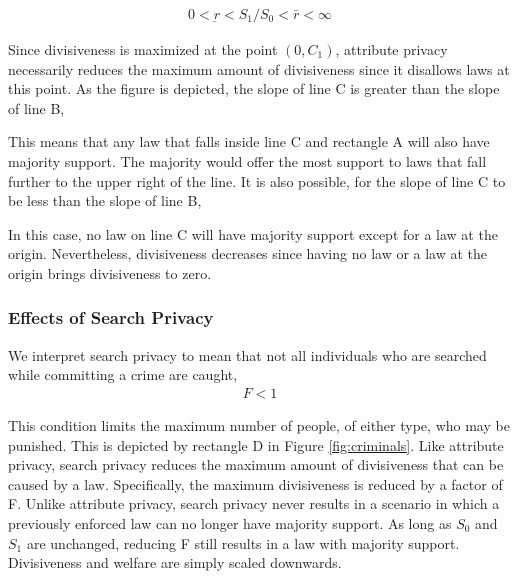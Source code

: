 \begin{align}
0 < \underbar r < S_1 /S_0 < \bar r < \infty
\end{align}

Since divisiveness is maximized at the point $ \left(0, C_1 \right)$, attribute privacy necessarily reduces the maximum amount of divisiveness since it disallows laws at this point.  As the figure is depicted, the slope of line C is greater than the slope of line B,


This means that any law that falls inside line C and rectangle A will also have majority support.  The majority would offer the most support to laws that fall further to the upper right of the line.  It is also possible, for the slope of line C to be less than the slope of line B,
%

In this case, no law on line C will have majority support except for a law at the origin.  Nevertheless, divisiveness decreases since having no law or a law at the origin brings divisiveness to zero.


\subsubsection{Effects of Search Privacy}

We interpret search privacy to mean that not all individuals who are searched while committing a crime are caught, 
\begin{align}
F<1
\end{align}

This condition limits the maximum number of people, of either type, who may be punished.  This is depicted by rectangle D in Figure \ref{fig:criminals}.  Like attribute privacy, search privacy reduces the maximum amount of divisiveness that can be caused by a law.  Specifically, the maximum divisiveness is reduced by a factor of F.  Unlike attribute privacy, search privacy never results in a scenario in which a previously enforced law can no longer have majority support.  As long as $S_0$ and $S_1$ are unchanged, reducing F still results in a law with majority support.  Divisiveness and welfare are simply scaled downwards.

